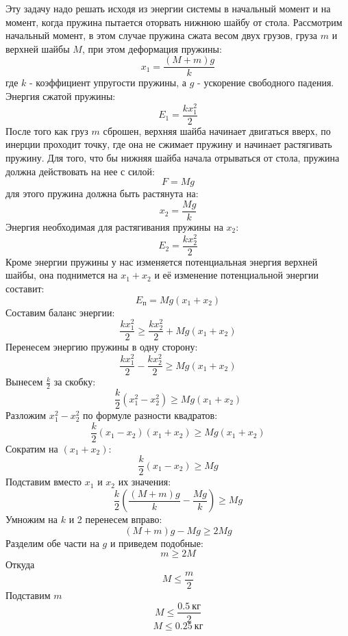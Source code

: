 \documentclass{minimal}
\begin{document}
    Эту задачу надо решать исходя из энергии системы в начальный момент и на момент, когда пружина пытается оторвать нижнюю шайбу от стола. Рассмотрим начальный момент, в этом случае пружина сжата весом двух грузов, груза $m$ и верхней
    шайбы $M$, при этом деформация пружины:
    \[
        x_1 = \frac{(M + m)g}{k}
    \]
    где $k$ - коэффициент упругости пружины, а $g$ - ускорение свободного падения. Энергия сжатой пружины:
    \[
        E_1 = \frac{k x_1^2}{2}
    \]
    После того как груз $m$ сброшен, верхняя шайба начинает двигаться вверх, по инерции проходит точку, где она не сжимает пружину и начинает растягивать пружину. Для того, что бы нижняя шайба начала отрываться от стола, пружина должна
    действовать на нее с силой:
    \[
        F = Mg
    \]
    для этого пружина должна быть растянута на:
    \[
        x_2 = \frac{Mg}{k}
    \]
    Энергия необходимая для растягивания пружины на $x_2$:
    \[
        E_2=\frac{k x_2^2}{2}
    \]
    Кроме энергии пружины у нас изменяется потенциальная энергия верхней шайбы, она поднимется на $x_1 + x_2$ и её изменение потенциальной энергии составит:
    \[
        E_{\text{п}} = Mg(x_1 + x_2)
    \]
    Составим баланс энергии:
    \[
        \frac{k x_1^2}{2} \geqslant \frac{k x_2^2}{2} + Mg(x_1 + x_2)
    \]
    Перенесем энергию пружины в одну сторону:
    \[
        \frac{k x_1^2}{2} - \frac{k x_2^2}{2} \geqslant Mg(x_1 + x_2)
    \]
    Вынесем $\frac{k}{2}$ за скобку:
    \[
        \frac{k}{2}(x_1^2 - x_2^2) \geqslant Mg(x_1 + x_2)
    \]
    Разложим $x_1^2 - x_2^2$ по формуле разности квадратов:
    \[
        \frac{k}{2}(x_1 - x_2)(x_1 + x_2) \geqslant Mg(x_1 + x_2)
    \]
    Сократим на $(x_1 + x_2)$:
    \[
        \frac{k}{2}(x_1 - x_2) \geqslant Mg
    \]
    Подставим вместо $x_1$ и $x_2$ их значения:
    \[
        \frac{k}{2}(\frac{(M + m)g}{k} - \frac{Mg}{k}) \geqslant Mg
    \]
    Умножим на $k$ и 2 перенесем вправо:
    \[
        (M + m)g - Mg \geqslant 2Mg
    \]
    Разделим обе части на $g$ и приведем подобные:
    \[
        m \geqslant 2M
    \]
    Откуда
    \[
        M \leqslant \frac{m}{2}
    \]
    Подставим $m$
    \[
        M \leqslant \frac{0.5\ \text{кг}}{2}
    \]
    \[
        M \leqslant 0.25\ \text{кг}
    \]
\end{document}
